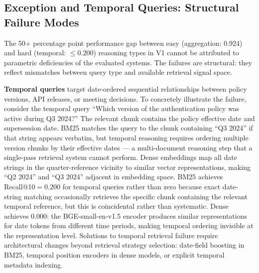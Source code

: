 \documentclass[11pt, a4paper]{article}
\begin{document}
\subsection{Exception and Temporal Queries: Structural Failure Modes}

The 50+ percentage point performance gap between easy (aggregation: 0.924) and hard (temporal: $\leq 0.200$) reasoning types in V1 cannot be attributed to parametric deficiencies of the evaluated systems. The failures are structural: they reflect mismatches between query type and available retrieval signal space.

\textbf{Temporal queries} target date-ordered sequential relationships between policy versions, API releases, or meeting decisions. To concretely illustrate the failure, consider the temporal query ``Which version of the authentication policy was active during Q3 2024?'' The relevant chunk contains the policy effective date and supersession date. BM25 matches the query to the chunk containing ``Q3 2024'' if that string appears verbatim, but temporal reasoning requires ordering multiple version chunks by their effective dates --- a multi-document reasoning step that a single-pass retrieval system cannot perform. Dense embeddings map all date strings in the quarter-reference vicinity to similar vector representations, making ``Q2 2024'' and ``Q3 2024'' adjacent in embedding space. BM25 achieves Recall@10$={0.200}$ for temporal queries rather than zero because exact date-string matching occasionally retrieves the specific chunk containing the relevant temporal reference, but this is coincidental rather than systematic. Dense achieves 0.000: the BGE-small-en-v1.5 encoder produces similar representations for date tokens from different time periods, making temporal ordering invisible at the representation level. Solutions to temporal retrieval failure require architectural changes beyond retrieval strategy selection: date-field boosting in BM25, temporal position encoders in dense models, or explicit temporal metadata indexing.
\end{document}
